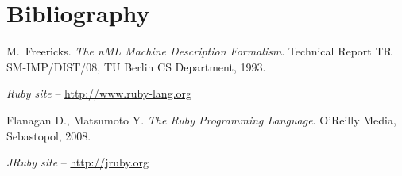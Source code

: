 \chapter{Bibliography}
\begin{thebibliography}{99}

M.~Freericks.
\emph{The nML Machine Description Formalism}.
Technical Report TR SM-IMP/DIST/08, TU Berlin CS Department, 1993.

\emph{Ruby site} -- \url{http://www.ruby-lang.org}

Flanagan D., Matsumoto Y.
\emph{The Ruby Programming Language}.
O’Reilly Media, Sebastopol, 2008.

\emph{JRuby site} -- \url{http://jruby.org}

\end{thebibliography}
